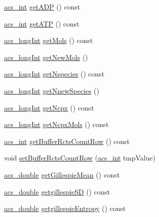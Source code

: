 \begin{DoxyCompactItemize}
\item 
\hyperlink{a00050_a8d277355641a098190360234e2ebde35}{acs\+\_\+int} \hyperlink{a00013_a69d18914fe7c8e96b10992668960b83b}{get\+A\+D\+P} () const 
\item 
\hyperlink{a00050_a8d277355641a098190360234e2ebde35}{acs\+\_\+int} \hyperlink{a00013_a02346c5d824e83e0a76dd01f4672ad8b}{get\+A\+T\+P} () const 
\item 
\hyperlink{a00050_a19319d75f02db4308bc5c0026d98cd85}{acs\+\_\+long\+Int} \hyperlink{a00013_a5a2ee72147144e7a04f4b363f1cc0914}{get\+Mols} () const 
\item 
\hyperlink{a00050_a19319d75f02db4308bc5c0026d98cd85}{acs\+\_\+long\+Int} \hyperlink{a00013_acae65ac60e1d746dc3063ae7948b684e}{get\+New\+Mols} ()
\item 
\hyperlink{a00050_a19319d75f02db4308bc5c0026d98cd85}{acs\+\_\+long\+Int} \hyperlink{a00013_aebc2bf6d400686a73dae1f6162cfeadc}{get\+Nspecies} () const 
\item 
\hyperlink{a00050_a19319d75f02db4308bc5c0026d98cd85}{acs\+\_\+long\+Int} \hyperlink{a00013_a35fc896cc5fb146855f628e8c2067023}{get\+Nnew\+Species} ()
\item 
\hyperlink{a00050_a19319d75f02db4308bc5c0026d98cd85}{acs\+\_\+long\+Int} \hyperlink{a00013_a5f6c40cbf788d58db588dc6280f0174f}{get\+Ncpx} () const 
\item 
\hyperlink{a00050_a19319d75f02db4308bc5c0026d98cd85}{acs\+\_\+long\+Int} \hyperlink{a00013_a39bb98a336b69f25479b8f82b9928bd3}{get\+Ncpx\+Mols} () const 
\item 
\hyperlink{a00050_a8d277355641a098190360234e2ebde35}{acs\+\_\+int} \hyperlink{a00013_ab87d94260cc7a7b388deca45fddb6031}{get\+Buffer\+Rcts\+Count\+Row} () const 
\item 
void \hyperlink{a00013_a634e0560af8805958d99e0ad8f0b5feb}{set\+Buffer\+Rcts\+Count\+Row} (\hyperlink{a00050_a8d277355641a098190360234e2ebde35}{acs\+\_\+int} tmp\+Value)
\item 
\hyperlink{a00050_ab776853a005fcbf56af0424a2a4dd607}{acs\+\_\+double} \hyperlink{a00013_a389a70abe42c7652c9511b7ed3b974c0}{get\+Gillespie\+Mean} () const 
\item 
\hyperlink{a00050_ab776853a005fcbf56af0424a2a4dd607}{acs\+\_\+double} \hyperlink{a00013_a41d9f79794b74845f2d00b4c0affea02}{getgillespie\+S\+D} () const 
\item 
\hyperlink{a00050_ab776853a005fcbf56af0424a2a4dd607}{acs\+\_\+double} \hyperlink{a00013_af4cba1a1f9c1c0106241ca5338b7906d}{getgillespie\+Entropy} () const 
\item 

\end{DoxyCompactItemize}
